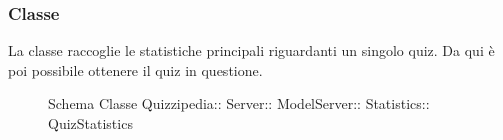 \subsubsection{Classe }
La classe raccoglie le statistiche principali riguardanti un singolo quiz. Da qui è poi possibile ottenere il quiz in questione.
\begin{figure}[H]
\centering
\noindent{}
\caption[Schema Classe QuizStatistics]{Schema Classe Quizzipedia:: Server:: ModelServer:: Statistics:: QuizStatistics}
\end{figure}
